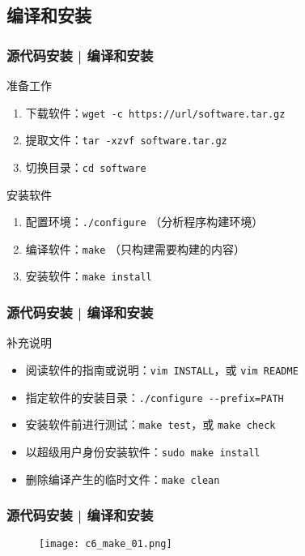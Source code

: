 \subsection{编译和安装}
\begin{frame}[fragile]
  \frametitle{源代码安装 | \alert{编译和安装}}
  \begin{block}{准备工作}
    \begin{enumerate}
      \item 下载软件：\verb|wget -c https://url/software.tar.gz|
      \item 提取文件：\verb|tar -xzvf software.tar.gz|
      \item 切换目录：\verb|cd software|
    \end{enumerate}
  \end{block}
  \pause
  \begin{block}{安装软件}
    \begin{enumerate}
      \item 配置环境：\verb|./configure| （分析程序构建环境）
      \item 编译软件：\verb|make| （只构建需要构建的内容）
      \item 安装软件：\verb|make install|
    \end{enumerate}
  \end{block}
\end{frame}

\begin{frame}[fragile]
  \frametitle{源代码安装 | 编译和安装}
  \begin{block}{补充说明}
    \begin{itemize}
      \item 阅读软件的指南或说明：\verb|vim INSTALL|，或 \verb|vim README|
      \item 指定软件的安装目录：\verb|./configure --prefix=PATH|
      \item 安装软件前进行测试：\verb|make test|，或 \verb|make check|
      \item 以超级用户身份安装软件：\verb|sudo make install|
      \item 删除编译产生的临时文件：\verb|make clean|
    \end{itemize}
  \end{block}
\end{frame}

\begin{frame}
  \frametitle{源代码安装 | 编译和安装}
  \begin{figure}
    \centering
    \texttt{[image: c6\_make\_01.png]}
  \end{figure}
\end{frame}

